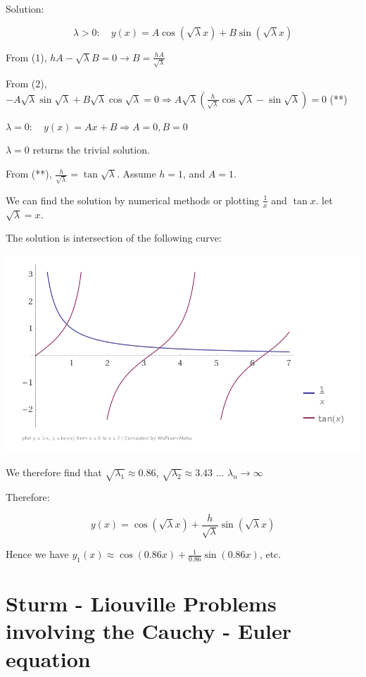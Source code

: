 \documentclass{article}
\begin{document}
Solution:

$$\lambda > 0: \quad y(x) = A \cos (\sqrt{\lambda} x) + B \sin( \sqrt{\lambda} x)$$

From (1), $h A - \sqrt{\lambda} B = 0 \to B = \frac{h A}{\sqrt{\lambda}}$

From (2), $- A \sqrt{\lambda} \sin \sqrt{\lambda} + B \sqrt{\lambda} \cos \sqrt{\lambda} = 0 \Rightarrow A \sqrt{\lambda} \left( \frac{h}{\sqrt{\lambda}} \cos \sqrt{\lambda} - \sin \sqrt{\lambda} \right) = 0$ (**)

\hfill

$\lambda = 0: \quad y(x) = Ax + B \Rightarrow A = 0, B = 0$

$\lambda = 0$ returns the trivial solution. 


From (**), $\frac{h}{\sqrt{\lambda}} = \tan \sqrt{\lambda}$. Assume $h = 1$, and $A = 1$. 

We can find the solution by numerical methods or plotting $\frac{1}{x}$ and $\tan x$. let $\sqrt{\lambda} = x$. 

The solution is intersection of the following curve:

\begin{center}
    \includegraphics[width = 0.9 \textwidth]{4.png}
\end{center}

We therefore find that $\sqrt{\lambda_1} \approx 0.86$, $\sqrt{\lambda_2} \approx 3.43$ ... $\lambda_n \to \infty$

Therefore:

$$y(x) = \cos (\sqrt{\lambda} x) + \frac{h}{\sqrt{\lambda}} \sin( \sqrt{\lambda} x)$$

Hence we have $y_1 (x) \approx \cos (0.86x) + \frac{1}{0.86} \sin(0.86 x)$, etc. 

\section{Sturm - Liouville Problems involving the Cauchy - Euler equation}
\end{document}
